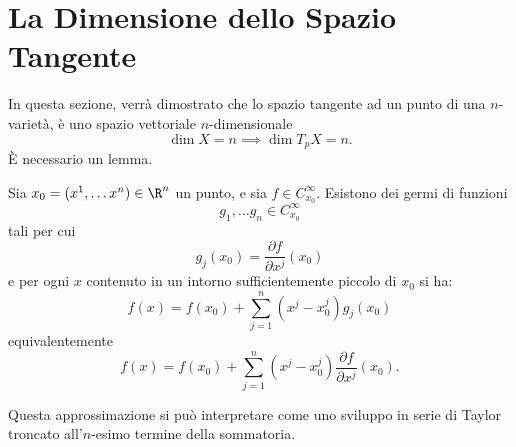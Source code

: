 \documentclass[10pt, letterpaper]{report}
\begin{document}
\section{La Dimensione dello Spazio Tangente}
In questa sezione, verrà dimostrato che lo spazio tangente ad un punto di una $n$-varietà, è uno spazio vettoriale $n$-dimensionale\begin{equation}
    \dim X=n\implies\dim T_pX=n.
\end{equation}
È necessario un lemma.
\begin{lemma2}\label{lemma:funzioni_g}
Sia $x_0=(x^1,\dots x^n)\in\R^n$ un punto, e sia $f\in C^\infty_ {x_0}$. Esistono dei germi di funzioni\begin{equation}
    g_1,\dots g_n\in C^\infty_ {x_0}
\end{equation}
tali per cui\begin{equation}
    g_j(x_0)=\frac{\partial f}{\partial x^j}(x_0)
\end{equation}
e per ogni $x$ contenuto in un intorno sufficientemente piccolo di $x_0$ si ha:\begin{equation}
    f(x)=f(x_0)+\sum_{j=1}^n(x^j-x_0^j) g_j(x_0)
\end{equation}
equivalentemente\begin{equation}
     f(x)=f(x_0)+\sum_{j=1}^n(x^j-x_0^j)\frac{\partial f}{\partial x^j}(x_0).
\end{equation}
\end{lemma2}
Questa approssimazione si può interpretare come uno sviluppo in serie di Taylor troncato all'$n$-esimo termine della sommatoria.\bigskip
\end{document}
